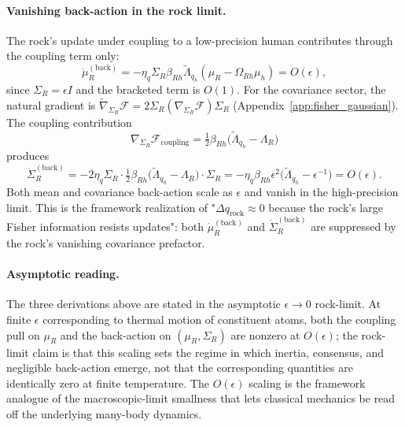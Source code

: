 \documentclass[11pt]{article}
\begin{document}
\paragraph{Vanishing back-action in the rock limit.} The rock's update under coupling to a low-precision human contributes through the coupling term only:
\begin{equation}
\dot{\mu}_R^{(\mathrm{back})} = -\eta_q \Sigma_R \beta_{Rh} \tilde{\Lambda}_{q_h}(\mu_R - \Omega_{Rh}\mu_h) = O(\epsilon),
\label{eq:rock_back_mu}
\end{equation}
since $\Sigma_R = \epsilon I$ and the bracketed term is $O(1)$. For the covariance sector, the natural gradient is $\tilde{\nabla}_{\Sigma_R}\mathcal{F} = 2\Sigma_R(\nabla_{\Sigma_R}\mathcal{F})\Sigma_R$ (Appendix~\ref{app:fisher_gaussian}). The coupling contribution
\begin{equation}
\nabla_{\Sigma_R}\mathcal{F}_{\mathrm{coupling}} = \tfrac{1}{2}\beta_{Rh}\big(\tilde{\Lambda}_{q_h} - \Lambda_R\big)
\end{equation}
produces
\begin{equation}
\dot{\Sigma}_R^{(\mathrm{back})} = -2\eta_q \Sigma_R \cdot \tfrac{1}{2}\beta_{Rh}\big(\tilde{\Lambda}_{q_h} - \Lambda_R\big)\cdot \Sigma_R = -\eta_q \beta_{Rh} \epsilon^2 \big(\tilde{\Lambda}_{q_h} - \epsilon^{-1}\big) = O(\epsilon).
\label{eq:rock_back_sigma}
\end{equation}
Both mean and covariance back-action scale as $\epsilon$ and vanish in the high-precision limit. This is the framework realization of "$\Delta q_{\mathrm{rock}} \approx 0$ because the rock's large Fisher information resists updates": both $\dot{\mu}_R^{(\mathrm{back})}$ and $\dot{\Sigma}_R^{(\mathrm{back})}$ are suppressed by the rock's vanishing covariance prefactor.

\paragraph{Asymptotic reading.} The three derivations above are stated in the asymptotic $\epsilon \to 0$ rock-limit. At finite $\epsilon$ corresponding to thermal motion of constituent atoms, both the coupling pull on $\mu_R$ and the back-action on $(\mu_R, \Sigma_R)$ are nonzero at $O(\epsilon)$; the rock-limit claim is that this scaling sets the regime in which inertia, consensus, and negligible back-action emerge, not that the corresponding quantities are identically zero at finite temperature. The $O(\epsilon)$ scaling is the framework analogue of the macroscopic-limit smallness that lets classical mechanics be read off the underlying many-body dynamics.
\end{document}
